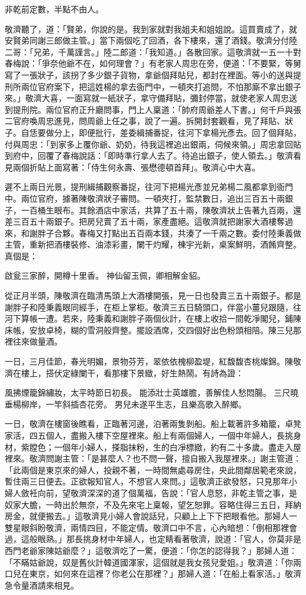 非乾前定數，半點不由人。

敬濟聽了，道：「賢弟，你說的是。我到家就對我姐夫和姐姐說。這買賣成了，就安賢弟同謝三郎做主管。」當下兩個吃了回酒，各下樓來，還了酒錢。敬濟分付陸二哥：「兄弟，千萬謹言。」陸二郎道：「我知道。」各散回家。這敬濟就一五一十對春梅說：「爭奈他爺不在，如何理會？」有老家人周忠在旁，便道：「不要緊，等舅寫了一張狀子，該拐了多少銀子貨物，拿爺個拜貼兒，都封在裡面。等小的送與提刑所兩位官府案下，把這姓楊的拿去衙門中，一頓夾打追問，不怕那廝不拿出銀子來。」敬濟大喜，一面寫就一紙狀子，拿守備拜貼，彌封停當，就使老家人周忠送到提刑院。兩位官府正升廳問事，門上人稟道：「帥府周爺差人下書。」何千戶與張二官府喚周忠進見，問周爺上任之事，說了一遍。拆開封套觀看，見了拜貼、狀子。自恁要做分上，即便批行，差委緝捕番捉，往河下拿楊光彥去。回了個拜貼，付與周忠：「到家多上覆你爺、奶奶，待我這裡追出銀兩，伺候來領。」周忠拿回貼到府中，回覆了春梅說話：「即時準行拿人去了。待追出銀子，使人領去。」敬濟看見兩個折貼上面寫著：「侍生何永壽、張懋德頓首拜」。敬濟心中大喜。

遲不上兩日光景，提刑緝捕觀察番捉，往河下把楊光彥並兄弟楊二風都拿到衙門中。兩位官府，據著陳敬濟狀子審問。一頓夾打，監禁數日，追出三百五十兩銀子，一百桶生眼布。其餘酒店中家活，共算了五十兩，陳敬濟狀上告著九百兩，還差三百五十兩銀子。把房兒賣了五十兩，家產盡絕。這敬濟就把謝家大酒樓奪過來，和謝胖子合夥。春梅又打點出五百兩本錢，共湊了一千兩之數。委付陸秉義做主管，重新把酒樓裝修、油漆彩畫，闌干灼耀，棟宇光新，桌案鮮明，酒餚齊整。真個是：

啟瓮三家醉，開樽十里香。
神仙留玉佩，卿相解金貂。

從正月半頭，陳敬濟在臨清馬頭上大酒樓開張，見一日也發賣三五十兩銀子。都是謝胖子和陸秉義眼同經手，在柜上掌柜。敬濟三五日騎頭口，伴當小薑兒跟隨，往河下算帳一遭。若來，陸秉義和謝胖子兩個伙計，在樓上收拾一間乾凈閣兒，鋪陳床帳，安放卓椅，糊的雪洞般齊整。擺設酒席，交四個好出色粉頭相陪。陳三兒那裡往來做量酒。

一日，三月佳節，春光明媚，景物芬芳，翠依依槐柳盈堤，紅馥馥杏桃燦錦。陳敬濟在樓上，搭伏定綠闌干，看那樓下景緻，好生熱鬧。有詩為證：

風拂煙籠錦繡妝，太平時節日初長。
能添壯士英雄膽，善解佳人愁悶腸。
三尺曉垂楊柳岸，一竿斜插杏花旁。
男兒未遂平生志，且樂高歌入醉鄉。

一日，敬濟在樓窗後瞧看，正臨著河邊，泊著兩隻剝船。船上載著許多箱籠，卓凳家活，四五個人，盡搬入樓下空屋裡來。船上有兩個婦人，一個中年婦人，長挑身材，紫膛色；一個年小婦人，搽脂抹粉，生的白凈標緻，約有二十多歲。盡走入屋裡來。敬濟問謝主管：「是甚麼人？也不問一聲，擅自搬入我屋裡來。」謝主管道：「此兩個是東京來的婦人，投親不著，一時間無處尋房住，央此間鄰居範老來說，暫住兩三日便去。正欲報知官人，不想官人來問。」這敬濟正欲發怒，只見那年小婦人斂衽向前，望敬濟深深的道了個萬福，告說：「官人息怒，非乾主管之事，是奴家大膽，一時出於無奈，不及先來宅上稟報，望乞恕罪。容略住得三五日，拜納房金，就便搬去。」這敬濟見小婦人會說話兒，只顧上上下下把眼看他。那婦人一雙星眼斜盼敬濟，兩情四目，不能定情。敬濟口中不言，心內暗想：「倒相那裡會過，這般眼熟。」那長挑身材中年婦人，也定睛看著敬濟，說道：「官人，你莫非是西門老爺家陳姑爺麼？」這敬濟吃了一驚，便道：「你怎的認得我？」那婦人道：「不瞞姑爺說，奴是舊伙計韓道國渾家，這個就是我女孩兒愛姐。」敬濟道：「你兩口兒在東京，如何來在這裡？你老公在那裡？」那婦人道：「在船上看家活。」敬濟急令量酒請來相見。

